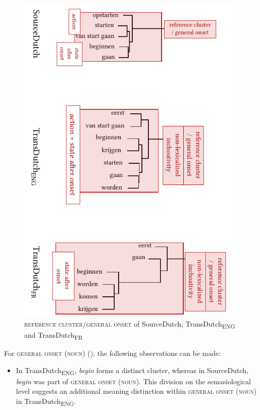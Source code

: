 \begin{figure}
\includegraphics{figures/tree87.pdf}
\caption{\label{fig:4:84}\textsc{reference cluster}/\textsc{general onset} of SourceDutch, TransDutch\textsubscript{ENG} and TransDutch\textsubscript{FR}}
\end{figure}

\noindent For \textsc{general onset} (\textsc{noun}) (), the following observations can be made:

\begin{itemize}
\item  In TransDutch\textsubscript{ENG}, \textit{begin} forms a distinct cluster, whereas in SourceDutch, \textit{begin} was part of \textsc{general onset} (\textsc{noun}). This division on the semasiological level suggests an additional meaning distinction within \textsc{general onset} (\textsc{noun}) in TransDutch\textsubscript{ENG}.
\end{itemize}

